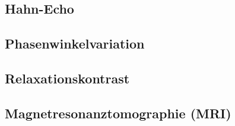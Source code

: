 \documentclass[../main.tex]{subfiles}
\begin{document}
\subsection{Hahn-Echo}
    

    \subsection{Phasenwinkelvariation}
        

\subsection{Relaxationskontrast}
       
    
\subsection{Magnetresonanztomographie (MRI)}
    
        
        
\end{document}

